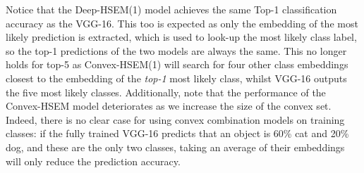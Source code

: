 \documentclass[12pt]{report}
\begin{document}
Notice that the Deep-HSEM(1) model achieves the same Top-1 classification accuracy as the VGG-16. This too is expected as only the embedding of the most likely prediction is extracted, which is used to look-up the most likely class label, so the top-1 predictions of the two models are always the same. This no longer holds for top-5 as Convex-HSEM(1) will search for four other class embeddings closest to the embedding of the \textit{top-1} most likely class, whilst VGG-16 outputs the five most likely classes. Additionally, note that the performance of the Convex-HSEM model deteriorates as we increase the size of the convex set. Indeed, there is no clear case for using convex combination models on training classes: if the fully trained VGG-16 predicts that an object is 60\% cat and 20\% dog, and these are the only two classes, taking an average of their embeddings will only reduce the prediction accuracy.
\end{document}
